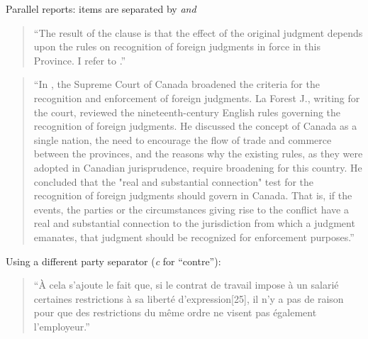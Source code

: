 \p Parallel reports: items are separated by \textit{and}

\begin{quotation}
``The result of the clause is that the effect of the original judgment depends upon the rules on recognition of foreign judgments in force in this Province. I refer to  .''
\end{quotation}


\citetrackerfalse
{}
\citetrackertrue

\begin{quotation}
``In , the Supreme Court of Canada broadened the criteria for the recognition and enforcement of foreign judgments. La Forest J., writing for the court, reviewed the nineteenth-century English rules governing the recognition of foreign judgments. He discussed the concept of Canada as a single nation, the need to encourage the flow of trade and commerce between the provinces, and the reasons why the existing rules, as they were adopted in Canadian jurisprudence, require broadening for this country. He concluded that the "real and substantial connection" test for the recognition of foreign judgments should govern in Canada. That is, if the events, the parties or the circumstances giving rise to the conflict have a real and substantial connection to the jurisdiction from which a judgment emanates, that judgment should be recognized for enforcement purposes.''
\end{quotation}

\p Using a different party separator (\textit{c} for ``contre''):

{}

\begin{quotation}
``À cela s’ajoute le fait que, si le contrat de travail impose à un salarié certaines restrictions à sa liberté d’expression[25], il n’y a pas de raison pour que des restrictions du même ordre ne visent pas également l’employeur.''
\end{quotation}

